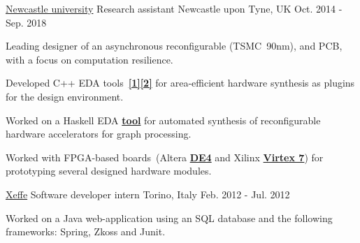 
\begin{cventries}

\cventry
{\href{https://www.ncl.ac.uk/}{\color{myblue}Newcastle university}}
{Research assistant} %
{Newcastle upon Tyne, UK} %
{Oct. 2014 - Sep. 2018} %
{ 
\begin{cvitems}
\item {Leading designer of an asynchronous reconfigurable
\href{https://ieeexplore.ieee.org/document/8342264/}{}
(TSMC~90nm), and PCB, with a focus on computation resilience.}
\item {Developed C++ EDA
tools~{\color{myblue}\href{https://github.com/tuura/shutters}{\textbf{[1]}}}{\color{myblue}\href{https://github.com/tuura/scenco}{\textbf{[2]}}}
for area-efficient hardware synthesis as plugins for the
\href{https://workcraft.org/}{}
design environment.}
\item {Worked on a Haskell EDA 
{\color{myblue}\href{https://github.com/tuura/fantasi/tree/master/doc}{\textbf{tool}}}
for automated synthesis of reconfigurable hardware accelerators for graph
processing.}
\item {Worked with FPGA-based boards~(Altera 
{\color{myblue}\href{https://www.altera.com/solutions/partners/partner-profile/terasic-inc-/board/de4-stratix-iv-development-board.html\#overview}{\textbf{DE4}}}
and Xilinx 
{\color{myblue}\href{https://www.xilinx.com/products/boards-and-kits/ek-v7-vc707-g.html}{\textbf{Virtex
 7}}}) for prototyping several designed hardware modules.}
\end{cvitems}
}


\cventry
{\color{myblue}\href{http://www.xeffe.it/}{Xeffe}}
{Software developer intern}
{Torino, Italy}
{Feb. 2012 - Jul. 2012}
{
\begin{cvitems}
Worked on a Java web-application using an SQL database and 
the following frameworks: Spring, Zkoss and Junit.
\end{cvitems}
}


\end{cventries}
\vspace{-1mm}